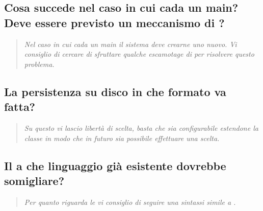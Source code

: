 \documentclass{scalatekids-article}
\begin{document}
\subsection{Cosa succede nel caso in cui cada un main? Deve essere previsto un meccanismo di ?}
\begin{quote}
  \textit{Nel caso in cui cada un main il sistema deve crearne uno nuovo. Vi consiglio di cercare di sfruttare qualche escamotage di  per risolvere questo problema.\\}
\end{quote}
\subsection{La persistenza su disco in che formato va fatta?}
\begin{quote}
  \textit{Su questo vi lascio libertà di scelta, basta che sia configurabile estendone la classe in modo che in futuro sia possibile effettuare una scelta.\\}
\end{quote}
\subsection{Il  a che linguaggio già esistente dovrebbe somigliare?}
\begin{quote}
  \textit{Per quanto riguarda le  vi consiglio di seguire una sintassi simile a .\\}
\end{quote}
\end{document}
